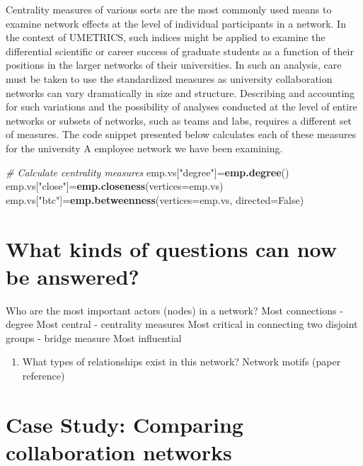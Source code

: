 \documentclass[]{krantz}
\newenvironment{Shaded}{\begin{snugshade}}{\end{snugshade}}
\newcommand{\KeywordTok}[1]{\textcolor[rgb]{0.13,0.29,0.53}{\textbf{#1}}}
\newcommand{\DataTypeTok}[1]{\textcolor[rgb]{0.13,0.29,0.53}{#1}}
\newcommand{\StringTok}[1]{\textcolor[rgb]{0.31,0.60,0.02}{#1}}
\newcommand{\CommentTok}[1]{\textcolor[rgb]{0.56,0.35,0.01}{\textit{#1}}}
\newcommand{\NormalTok}[1]{#1}
\providecommand{\tightlist}{%
  \setlength{\itemsep}{0pt}\setlength{\parskip}{0pt}}
\begin{document}
Centrality measures of various sorts are the most commonly used means to
examine network effects at the level of individual participants in a
network. In the context of UMETRICS, such indices might be applied to
examine the differential scientific or career success of graduate
students as a function of their positions in the larger networks of
their universities. In such an analysis, care must be taken to use the
standardized measures as university collaboration networks can vary
dramatically in size and structure. Describing and accounting for such
variations and the possibility of analyses conducted at the level of
entire networks or subsets of networks, such as teams and labs, requires
a different set of measures. The code snippet presented below calculates
each of these measures for the university A employee network we have
been examining.

\begin{Shaded}
\begin{Highlighting}[]
\CommentTok{# Calculate centrality measures}
\NormalTok{emp.vs[}\StringTok{"degree"}\NormalTok{]=}\KeywordTok{emp.degree}\NormalTok{()}
\NormalTok{emp.vs[}\StringTok{"close"}\NormalTok{]=}\KeywordTok{emp.closeness}\NormalTok{(}\DataTypeTok{vertices=}\NormalTok{emp.vs)}
\NormalTok{emp.vs[}\StringTok{"btc"}\NormalTok{]=}\KeywordTok{emp.betweenness}\NormalTok{(}\DataTypeTok{vertices=}\NormalTok{emp.vs, }\DataTypeTok{directed=}\NormalTok{False)}
\end{Highlighting}
\end{Shaded}

\section{What kinds of questions can now be
answered?}\label{what-kinds-of-questions-can-now-be-answered}

Who are the most important actors (nodes) in a network? Most connections
- degree Most central - centrality measures Most critical in connecting
two disjoint groups - bridge measure Most influential

\begin{enumerate}
\def\labelenumi{\arabic{enumi}.}
\setcounter{enumi}{1}
\tightlist
\item
  What types of relationships exist in this network? Network motifs
  (paper reference)
\end{enumerate}

\section{Case Study: Comparing collaboration
networks}\label{case-study-comparing-collaboration-networks}
\end{document}
